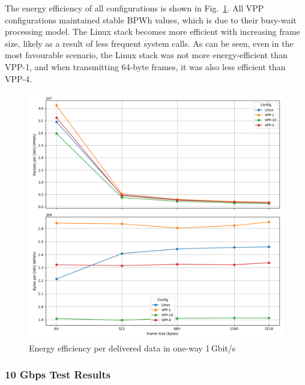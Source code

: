The energy efficiency of all configurations is shown in Fig.~\ref{fig:1g}. All VPP configurations maintained stable BPWh values, which is due to their busy-wait processing model.
The Linux stack becomes more efficient with increasing frame size, likely as a result of less frequent system calls.
As can be seen, even in the most favourable scenario, the Linux stack was not more energy-efficient than VPP-1, and when transmitting 64-byte frames, it was also less efficient than VPP-4.

\begin{figure}[!htbp]
    \centering
    \includegraphics[width=\linewidth]{images/consumption-1g.png}
    \caption{Energy efficiency per delivered data in one-way 1\,Gbit/s}
    \label{fig:1g}
\end{figure}


\subsubsection{10 Gbps Test Results}

